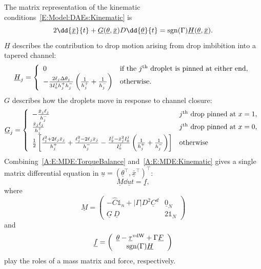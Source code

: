\begin{subappendices}
The matrix representation of the kinematic conditions~\eqref{E:Model:DAEs:Kinematic} is
\begin{equation}\label{A:E:MDE:Kinematic}
2\dd{\underline{\bar{x}}}{t} +\underline{G}(\underline{\theta},  \underline{\xbar})D\dd{\underline{\theta}}{t} =\sgn(\Gamma) \underline{H}(\underline{\theta},  \underline{\xbar}).
\end{equation}
$\underline{H}$ describes the contribution to drop motion arising from drop imbibition into a tapered channel:
\begin{equation}\label{A:E:MDE:H_definition}
\underline{H}_j =\left\{\begin{array}{ll}
0 & \text{if the}~j^{\text{th}}~\text{droplet is pinned at either end},\\
-\frac{2\ell_j\Delta \theta_j}{3I_0^j h_j^+ h_j^-} \left(\frac{1}{h_j^+} + \frac{1}{h_j^-}\right) & \text{otherwise}.
\end{array}\right.
\end{equation}
$G$ describes how the droplets move in response to channel closure:
\begin{equation*}
\underline{G}_j =\left\{\begin{array}{ll}
-\frac{\bar{x}_j \ell_j}{h_j^-} &j^{\text{th}}~\text{drop pinned at} ~ x = 1,\\
\frac{\bar{x}_j \ell_j}{h_j^+} & j^{\text{th}}~\text{drop pinned at} ~ x = 0,\\
\frac{1}{2} \left[\frac{\ell_j^2 + 2\ell_j \bar{x}_j}{h_j^+} + \frac{\ell_j^2 - 2\ell_j \bar{x}_j}{h_j^-} -  \frac{I_2^j - \bar{x}_j^2 I_0^j}{I_0^j} \left(\frac{1}{h_j^+} + \frac{1}{h_j^-}\right)\right] & \text{otherwise}\end{array}\right.
\end{equation*}
Combining~\eqref{A:E:MDE:TorqueBalance} and~\eqref{A:E:MDE:Kinematic} gives a single matrix differential equation in $\underline{u} =  (\underline{\theta}^\intercal, \underline{\bar{x}}^\intercal)^\intercal$:
\begin{equation}\label{A:E:MDE:MatrixDifferentialEquation}
\underline{M}\dd{\underline{u}}{t} =\underline{f},
\end{equation}
where
\begin{equation}\label{A:E:MDE:MassMatrix}
\underline{M} = \left(
\begin{array}{cc}
-\hat{C}\mathbb{1}_n + |\Gamma| D^2 \underline{C}^d & \underline{0}_{N} \\
\underline{G}~ \underline{D} & 2\mathbb{1}_{N}
\end{array}
\right)
\end{equation}
and
\begin{equation}\label{A:E:MDE:Forcing}
\underline{f} =  \left( \begin{array}{c} \underline{\theta} - \underline{\tau}^{\text{vdW}} + \Gamma \underline{F}\\ \mathrm{sgn}(\Gamma) \underline{H}\end{array}\right)
\end{equation}
play the roles of a mass matrix and force, respectively.

\end{subappendices}
